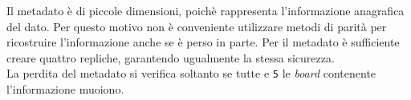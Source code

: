 Il metadato \`{e} di piccole dimensioni, poich\`{e} rappresenta l'informazione anagrafica del dato. 
Per questo motivo non \`{e} conveniente utilizzare metodi di parit\`{a} per ricostruire l'informazione anche se \`{e} perso in parte.
Per il metadato \`{e} sufficiente creare quattro repliche, garantendo ugualmente la stessa sicurezza. \\
La perdita del metadato si verifica soltanto se tutte e \verb"5" le \textit{board} contenente l'informazione muoiono.